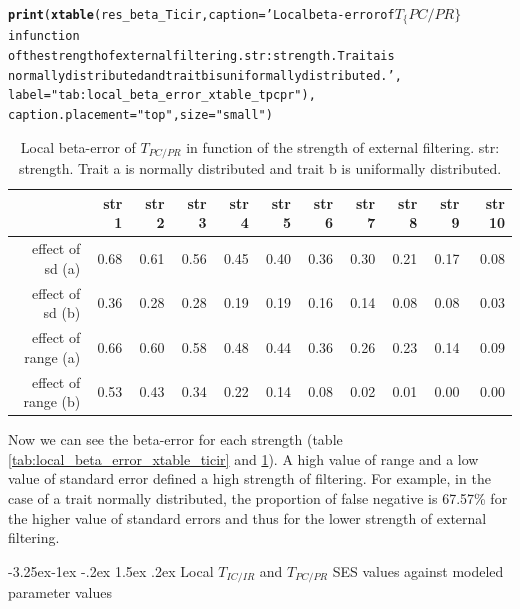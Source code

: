 \documentclass[12pt]{article}\usepackage[]{graphicx}\usepackage[]{color}
\makeatletter
\newcommand{\hlstr}[1]{\textcolor[rgb]{0.192,0.494,0.8}{#1}}%
\newcommand{\hlstd}[1]{\textcolor[rgb]{0.345,0.345,0.345}{#1}}%
\newcommand{\hlkwc}[1]{\textcolor[rgb]{0.333,0.667,0.333}{#1}}%
\newcommand{\hlkwd}[1]{\textcolor[rgb]{0.737,0.353,0.396}{\textbf{#1}}}%
\newenvironment{kframe}{%
 \def\at@end@of@kframe{}%
 \ifinner\ifhmode%
  \def\at@end@of@kframe{\end{minipage}}%
  \begin{minipage}{\columnwidth}%
 \fi\fi%
 \def\FrameCommand##1{\hskip\@totalleftmargin \hskip-\fboxsep
 \colorbox{shadecolor}{##1}\hskip-\fboxsep
     \hskip-\linewidth \hskip-\@totalleftmargin \hskip\columnwidth}%
 \MakeFramed {\advance\hsize-\width
   \@totalleftmargin\z@ \linewidth\hsize
   \@setminipage}}%
 {\par\unskip\endMakeFramed%
 \at@end@of@kframe}
\newcounter {subsubsubsection}[subsubsection]
\newcommand\subsubsubsection{\@startsection{subsubsubsection}{4}{\z@}%
          {-3.25ex\@plus -1ex \@minus -.2ex}%
          {1.5ex \@plus .2ex}%
          {\normalfont\normalsize\bfseries}}
\makeatother
\begin{document}
\begin{kframe}
\begin{alltt}
\hlkwd{print}\hlstd{(}\hlkwd{xtable}\hlstd{(res_beta_Ticir,} \hlkwc{caption} \hlstd{=} \hlstr{'Local beta-error of $T_\{PC/PR\}$ in function 
             of the strength of external filtering. str: strength. Trait a is 
             normally distributed and trait b is uniformally distributed.'}\hlstd{,}
             \hlkwc{label} \hlstd{=} \hlstr{"tab:local_beta_error_xtable_tpcpr"}\hlstd{),}
      \hlkwc{caption.placement} \hlstd{=} \hlstr{"top"}\hlstd{,} \hlkwc{size} \hlstd{=} \hlstr{"small"}\hlstd{)}
\end{alltt}
\end{kframe}%
\begin{table}[ht]
\centering
\caption{Local beta-error of $T_{PC/PR}$ in function 
             of the strength of external filtering. str: strength. Trait a is 
             normally distributed and trait b is uniformally distributed.} 
\label{tab:local_beta_error_xtable_tpcpr}
{\small
\begin{tabular}{rrrrrrrrrrr}
  \hline
 & str 1 & str 2 & str 3 & str 4 & str 5 & str 6 & str 7 & str 8 & str 9 & str 10 \\ 
  \hline
effect of sd (a) & 0.68 & 0.61 & 0.56 & 0.45 & 0.40 & 0.36 & 0.30 & 0.21 & 0.17 & 0.08 \\ 
  effect of sd (b) & 0.36 & 0.28 & 0.28 & 0.19 & 0.19 & 0.16 & 0.14 & 0.08 & 0.08 & 0.03 \\ 
  effect of range (a) & 0.66 & 0.60 & 0.58 & 0.48 & 0.44 & 0.36 & 0.26 & 0.23 & 0.14 & 0.09 \\ 
  effect of range (b) & 0.53 & 0.43 & 0.34 & 0.22 & 0.14 & 0.08 & 0.02 & 0.01 & 0.00 & 0.00 \\ 
   \hline
\end{tabular}
}
\end{table}

 
Now we can see the beta-error for each strength (table \ref{tab:local_beta_error_xtable_ticir} and \ref{tab:local_beta_error_xtable_tpcpr}). A high value of range and a low value of standard error defined a high strength of filtering. For example, in the case of a trait normally distributed, the proportion of false negative is 67.57\% for the higher value of standard errors and thus for the lower strength of external filtering.
 
 
  \subsubsubsection {Local $T_{IC/IR}$ and $T_{PC/PR}$ SES values against modeled parameter values}
  
\end{document}
